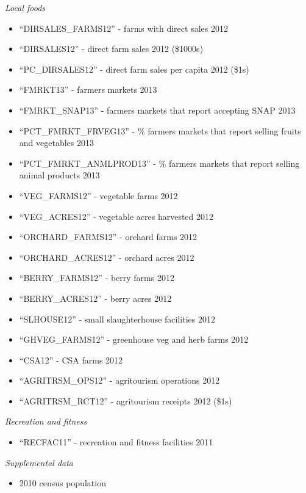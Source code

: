 \documentclass{article}
\begin{document}
\begin{itemize}[leftmargin=0pt]
\begin{enumerate}
        \textit{Local foods}
        \begin{itemize}
            \item[] “DIRSALES\_FARMS12” - farms with direct sales 2012
            \item[] “DIRSALES12” - direct farm sales 2012 (\$1000s)
            \item[] “PC\_DIRSALES12” - direct farm sales per capita 2012 (\$1s)
            \item[] “FMRKT13” - farmers markets 2013
            \item[] “FMRKT\_SNAP13” - farmers markets that report accepting SNAP 2013
            \item[] “PCT\_FMRKT\_FRVEG13” - \% farmers markets that report selling fruits and vegetables 2013
            \item[] “PCT\_FMRKT\_ANMLPROD13” - \% farmers markets that report selling animal products 2013
            \item[] “VEG\_FARMS12” - vegetable farms 2012
            \item[] “VEG\_ACRES12” - vegetable acres harvested 2012
            \item[] “ORCHARD\_FARMS12” - orchard farms 2012
            \item[] “ORCHARD\_ACRES12” - orchard acres 2012
            \item[] “BERRY\_FARMS12” - berry farms 2012
            \item[] “BERRY\_ACRES12” - berry acres 2012
            \item[] “SLHOUSE12” - small slaughterhouse facilities 2012
            \item[] “GHVEG\_FARMS12” - greenhouse veg and herb farms 2012
            \item[] “CSA12” - CSA farms 2012
            \item[] “AGRITRSM\_OPS12” - agritourism operations 2012
            \item[] “AGRITRSM\_RCT12” - agritourism receipts 2012 (\$1s)
        \end{itemize}

        \textit{Recreation and fitness}
        \begin{itemize}
            \item[] “RECFAC11” - recreation and fitness facilities 2011
        \end{itemize}
        
        \textit{Supplemental data}
        \begin{itemize}
            \item[] 2010 census population
        \end{itemize}


\end{enumerate}
\end{itemize}
\end{document}
